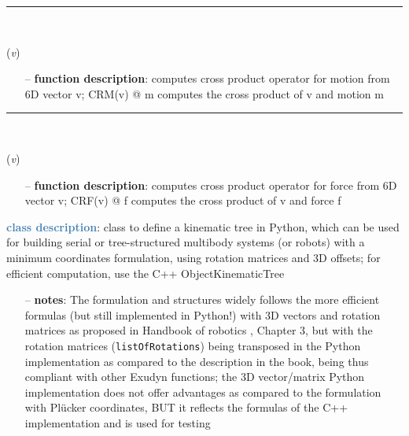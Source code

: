 \begin{itemize}[leftmargin=1.4cm]
\begin{itemize}[leftmargin=1.4cm]
\begin{itemize}[leftmargin=0.5cm]
\begin{itemize}[leftmargin=1.4cm]
\begin{itemize}[leftmargin=1.4cm]
\begin{itemize}[leftmargin=0.5cm]
\begin{itemize}[leftmargin=1.4cm]
\begin{itemize}[leftmargin=0.5cm]
\begin{itemize}[leftmargin=1.4cm]
\begin{itemize}[leftmargin=1.4cm]
\begin{itemize}[leftmargin=1.4cm]
%
\noindent\rule{8cm}{0.75pt}\vspace{1pt} \\ 
\begin{flushleft}
\label{sec:kinematicTree:CRM}
({\it v})
\end{flushleft}
\setlength{\itemindent}{0.7cm}
\begin{itemize}[leftmargin=0.7cm]
\item[--]{\bf function description}: computes cross product operator for motion from 6D vector v; CRM(v) @ m computes the cross product of v and motion m
\vspace{12pt}\end{itemize}
%
\noindent\rule{8cm}{0.75pt}\vspace{1pt} \\ 
\begin{flushleft}
\label{sec:kinematicTree:CRF}
({\it v})
\end{flushleft}
\setlength{\itemindent}{0.7cm}
\begin{itemize}[leftmargin=0.7cm]
\item[--]{\bf function description}: computes cross product operator for force from 6D vector v; CRF(v) @ f computes the cross product of v and force f
\vspace{12pt}\end{itemize}
%
\noindent\textcolor{steelblue}{{\bf class description}}:  class to define a kinematic tree in Python, which can be used for building serial or tree-structured multibody systems
         (or robots) with a minimum coordinates formulation, using rotation matrices and 3D offsets; for efficient computation, use the C++ ObjectKinematicTree
\setlength{\itemindent}{0.7cm}
\begin{itemize}[leftmargin=0.7cm]
\item[--]{\bf notes}: The formulation and structures widely follows the more efficient formulas (but still implemented in Python!) with 3D vectors and rotation matrices as proposed in Handbook of robotics \cite{Siciliano2016}, Chapter 3, but with the rotation matrices (\texttt{listOfRotations}) being transposed in the Python implementation as compared to the description in the book, being thus compliant with other Exudyn functions; the 3D vector/matrix Python implementation does not offer advantages as compared to the formulation with Pl\"ucker coordinates, BUT it reflects the formulas of the C++ implementation and is used for testing

\end{itemize}
\end{itemize}
\end{itemize}
\end{itemize}
\end{itemize}
\end{itemize}
\end{itemize}
\end{itemize}
\end{itemize}
\end{itemize}
\end{itemize}
\end{itemize}

